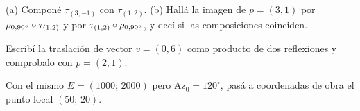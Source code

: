 \begin{ejercicio}
(a) Componé \(\tau_{(3,-1)}\) con \(\tau_{(1,2)}\). (b) Hallá la imagen de \(p=(3,1)\) por
\(\rho_{0,90^\circ}\circ\tau_{(1,2)}\) y por \(\tau_{(1,2)}\circ\rho_{0,90^\circ}\), y decí
si las composiciones coinciden.
\end{ejercicio}

\begin{ejercicio}
Escribí la traslación de vector \(v=(0,6)\) como producto de dos reflexiones y comprobalo con
\(p=(2,1)\).
\end{ejercicio}

\begin{ejercicio}
Con el mismo \(E=(1000;\,2000)\) pero \(\mathrm{Az}_0=120^\circ\), pasá a coordenadas de obra el
punto local \((50;\,20)\).
\end{ejercicio}
